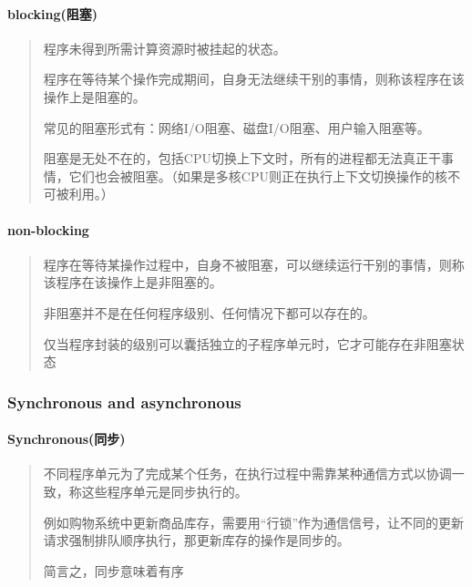 \documentclass[11pt]{article}
\begin{document}
    \hypertarget{blockingux963bux585e}{%
\paragraph{blocking(阻塞)}\label{blockingux963bux585e}}

\begin{quote}
程序未得到所需计算资源时被挂起的状态。

程序在等待某个操作完成期间，自身无法继续干别的事情，则称该程序在该操作上是阻塞的。

常见的阻塞形式有：网络I/O阻塞、磁盘I/O阻塞、用户输入阻塞等。

阻塞是无处不在的，包括CPU切换上下文时，所有的进程都无法真正干事情，它们也会被阻塞。（如果是多核CPU则正在执行上下文切换操作的核不可被利用。）
\end{quote}

    \hypertarget{non-blocking}{%
\paragraph{non-blocking}\label{non-blocking}}

\begin{quote}
程序在等待某操作过程中，自身不被阻塞，可以继续运行干别的事情，则称该程序在该操作上是非阻塞的。

非阻塞并不是在任何程序级别、任何情况下都可以存在的。

仅当程序封装的级别可以囊括独立的子程序单元时，它才可能存在非阻塞状态
\end{quote}

    \hypertarget{synchronous-and-asynchronous}{%
\subsubsection{Synchronous and
asynchronous}\label{synchronous-and-asynchronous}}

    \hypertarget{synchronousux540cux6b65}{%
\paragraph{Synchronous(同步)}\label{synchronousux540cux6b65}}

\begin{quote}
不同程序单元为了完成某个任务，在执行过程中需靠某种通信方式以协调一致，称这些程序单元是同步执行的。

例如购物系统中更新商品库存，需要用``行锁''作为通信信号，让不同的更新请求强制排队顺序执行，那更新库存的操作是同步的。

简言之，同步意味着有序
\end{quote}
\end{document}
